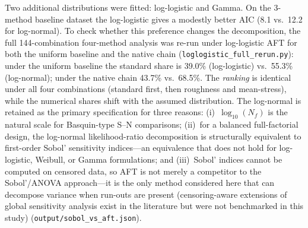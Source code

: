\documentclass[twocolumn,12pt,a4paper]{article}
\begin{document}
\begin{enumerate}
        Two additional distributions were fitted: log-logistic and
        Gamma. On the 3-method baseline dataset the log-logistic gives
        a modestly better AIC (8.1 vs.\ 12.2 for log-normal). To check
        whether this preference changes the decomposition, the full
        144-combination four-method analysis was re-run under
        log-logistic AFT for both the uniform baseline and the native
        chain (\texttt{loglogistic\_full\_rerun.py}): under the
        uniform baseline the standard share is 39.0\% (log-logistic)
        vs.\ 55.3\% (log-normal); under the native chain 43.7\% vs.\
        68.5\%. The \emph{ranking} is identical under all four
        combinations (standard first, then roughness and mean-stress),
        while the numerical shares shift with the assumed distribution.
        The log-normal is retained as the primary specification for
        three reasons: (i)~$\log_{10}(N_f)$ is the natural scale for
        Basquin-type S--N comparisons; (ii)~for a balanced full-factorial
        design, the log-normal likelihood-ratio decomposition is
        structurally equivalent to first-order Sobol' sensitivity
        indices---an equivalence that does not hold for log-logistic,
        Weibull, or Gamma formulations; and (iii)~Sobol' indices cannot
        be computed on censored data, so AFT is not merely a competitor to
        the Sobol'/ANOVA approach---it is the only method considered here
        that can decompose variance when run-outs are present
        (censoring-aware extensions of global sensitivity analysis exist in
        the literature but were not benchmarked in this study) (\texttt{output/sobol\_vs\_aft.json}).


\end{enumerate}
\end{document}
